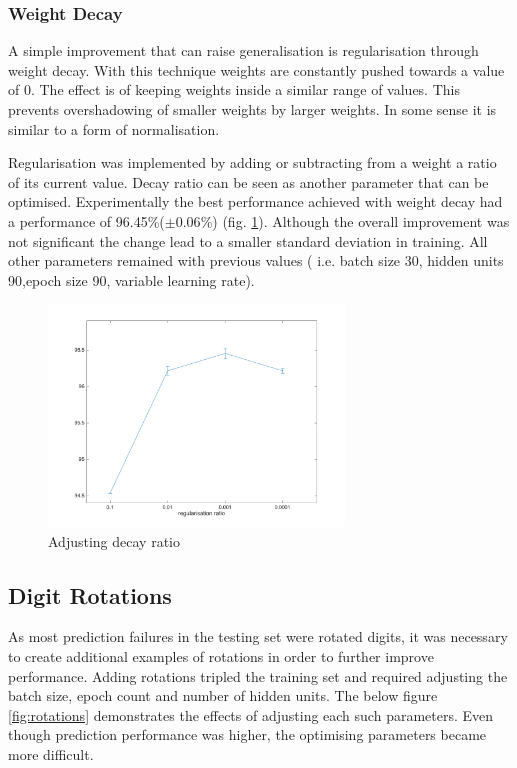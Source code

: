 \documentclass[11]{article}
\begin{document}
\subsubsection{Weight Decay}
A simple improvement that can raise generalisation is regularisation through weight decay. With this technique weights are constantly pushed towards a value of 0. The effect is of keeping weights inside a similar range of values. This prevents overshadowing of smaller weights by larger weights. In some sense it is similar to a form of normalisation.

Regularisation was implemented by adding or subtracting from a weight a ratio of its current value. Decay ratio can be seen as another parameter that can be optimised. Experimentally the best performance achieved with weight decay had a performance of 96.45\%($\pm 0.06\%$) (fig. \ref{fig:regularisation}).  Although the overall  improvement was not significant the change lead to a smaller standard deviation in training. All other parameters remained with previous values ( i.e. batch size 30, hidden units 90,epoch size 90, variable learning rate).

\begin{figure}[h]
\centering
\includegraphics[width=0.7\textwidth]{regularisation.png}
\caption{Adjusting decay ratio}
\label{fig:regularisation}
\end{figure}

\subsection{Digit Rotations}
As most prediction failures in the testing set were rotated digits, it was necessary to create additional examples of rotations in order to further improve performance. Adding rotations tripled the training set and required adjusting the batch size, epoch count and number of hidden units. The below figure \ref{fig:rotations} demonstrates the effects of adjusting each such parameters. Even though prediction performance was higher, the optimising parameters became more difficult. 
\end{document}
